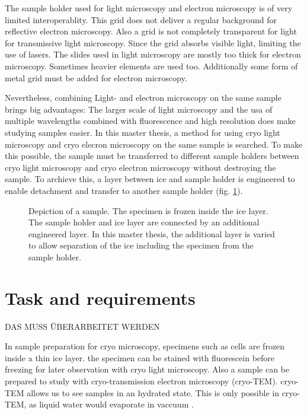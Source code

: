 The sample holder used for light microscopy and electron microscopy is of very limited interoperablity. This grid does not deliver a regular background for reflective electron microscopy. Also 
a grid is not completely transparent for light for transmissive light microscopy. Since the grid absorbs visible light, limiting the use of lasers. The slides used in light microscopy are mostly too thick for electron microscopy. Sometimes heavier elements are used too. Additionally some form of metal grid must be added for electron microscopy. 

Nevertheless, combining Light- and electron microscopy on the same sample brings big advantages: The larger scale of light microscopy and the usa of multiple wavelengths combined with fluorescence and high resolution does make studying samples easier. In this master thesis, a method for using cryo light microscopy and cryo elecron microscopy on the same sample is searched. To make this possible, the sample must be transferred to different sample holders between cryo light microscopy and cryo electron microscopy without destroying the sample. To archieve this, a layer between  ice and sample holder is engineered to enable detachment and transfer to another sample holder (fig. \ref{fig:layersingeneral}).

\begin{figure}[hbt!]
	\centering
	
	\caption{Depiction of a sample. The specimen is frozen inside the ice layer. The sample holder and ice layer are connected by an additional engineered layer. In this master thesis, the additional layer is varied to allow separation of the ice including the specimen from the sample holder.}
	\label{fig:layersingeneral}
\end{figure}


\section{Task and requirements}

DAS MUSS ÜBERARBEITET WERDEN

In sample preparation for cryo microscopy, specimens such as cells are frozen inside a thin ice layer. the specimen can be stained with fluorescein before freezing for later observation with cryo light microscopy. Also a sample can be prepared to study with cryo-transmission electron microscopy (cryo-TEM). cryo-TEM allows us to see samples in an hydrated state. This is only possible in cryo-TEM, as liquid water would evaporate in vaccuum \cite{Danino.2012}.

